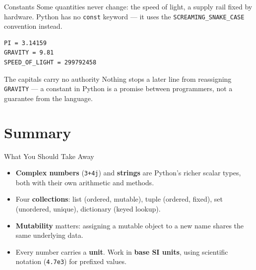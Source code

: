 \documentclass[9pt,aspectratio=169,xcolor=table]{beamer}
\begin{document}
\begin{frame}[fragile]{Constants}
    \leavevmode
    Some quantities never change: the speed of light, a supply rail
    fixed by hardware. Python has no \texttt{const} keyword --- it uses
    the \texttt{SCREAMING\_SNAKE\_CASE} convention instead.

\begin{lstlisting}
PI = 3.14159
GRAVITY = 9.81
SPEED_OF_LIGHT = 299792458
\end{lstlisting}

    \vspace{2mm}
    \begin{alertblock}{The capitals carry no authority}
        Nothing stops a later line from reassigning \texttt{GRAVITY} ---
        a constant in Python is a \alert{promise between programmers},
        not a guarantee from the language.
    \end{alertblock}
\end{frame}

\section{Summary}

\begin{frame}{What You Should Take Away}
    \leavevmode
    \small
    \begin{itemize}
        \item \textbf{Complex numbers} (\texttt{3+4j}) and
              \textbf{strings} are Python's richer scalar types, both
              with their own arithmetic and methods.
        \item Four \textbf{collections}: list (ordered, mutable), tuple
              (ordered, fixed), set (unordered, unique), dictionary
              (keyed lookup).
        \item \textbf{Mutability} matters: assigning a mutable object to
              a new name shares the same underlying data.
        \item Every number carries a \textbf{unit}. Work in \textbf{base
              SI units}, using scientific notation (\texttt{4.7e3}) for
              prefixed values.
    \end{itemize}
\end{frame}
\end{document}
